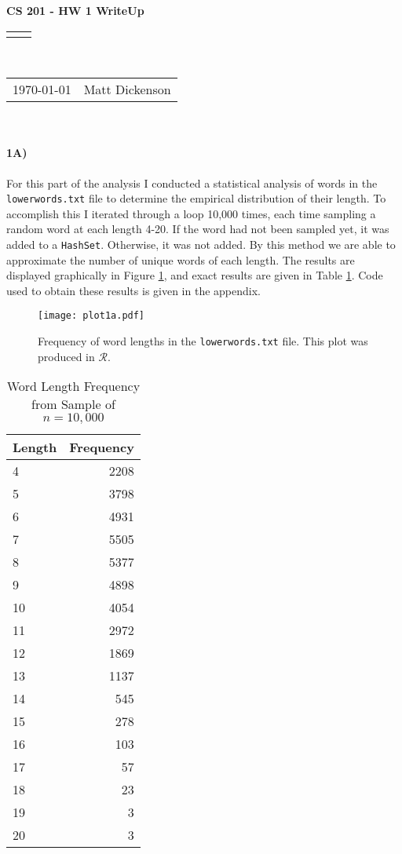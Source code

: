 \documentclass[12pt]{article}
\renewcommand{\title}[1]{\textbf{#1}\\}
\renewcommand{\line}{\begin{tabularx}{\textwidth}{X>{\raggedleft}X}\hline\\\end{tabularx}\\[-0.5cm]}
\newcommand{\leftright}[2]{\begin{tabularx}{\textwidth}{X>{\raggedleft}X}#1%
& #2\\\end{tabularx}\\[-0.5cm]}
\begin{document}
\title{CS 201 - HW 1 WriteUp}
\line
\leftright{\today}{Matt Dickenson} %

\paragraph{1A)} For this part of the analysis I conducted a statistical analysis of words in the \texttt{lowerwords.txt} file to determine the empirical distribution of their length. To accomplish this I iterated through a loop 10,000 times, each time sampling a random word at each length 4-20. If the word had not been sampled yet, it was added to a \texttt{HashSet}. Otherwise, it was not added. By this method we are able to approximate the number of unique words of each length. The results are displayed graphically in Figure \ref{fig1a}, and exact results are given in Table \ref{table1a}. Code used to obtain these results is given in the appendix. 

\begin{figure}[h]
\begin{center}
\texttt{[image: plot1a.pdf]}
\parbox{4in}{\caption{Frequency of word lengths in the \texttt{lowerwords.txt} file. This plot was produced in $\mathcal{R}$.} \label{fig1a} } 
\end{center}
\end{figure}

\begin{table}[h]
\begin{center}
\caption{Word Length Frequency from Sample of $n=10,000$}
\label{table1a}
\begin{tabular}{lr}
\toprule 
Length & Frequency \\
\midrule 
4 & 2208 \\
5 & 3798 \\
6 & 4931 \\ 
7 & 5505 \\
8 & 5377 \\
9 & 4898 \\
10 & 4054 \\
11 & 2972 \\
12 & 1869 \\
13 & 1137 \\
14 & 545 \\
15 & 278 \\
16 & 103 \\
17 & 57 \\
18 & 23 \\
19 & 3 \\
20 & 3 \\
\bottomrule
\end{tabular}
\end{center}
\end{table}
\end{document}
